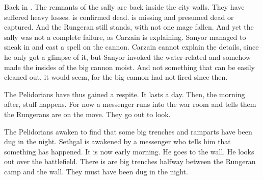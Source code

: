 
\begin{comment}
  \section{Takestsha casts the witch-storm}
\end{comment}


\begin{comment}
  \subsection{Pelidorian war room}
\end{comment}

Back in \Forclin. 
The remnants of the sally are back inside the city walls. 
They have suffered heavy losses. 
\Dornaer is confirmed dead. 
\Rah[\Theal] \Kintaer is missing and presumed dead or captured. 
And the Rungeran \ishrah still stands, with not one mage fallen.
And yet the sally was not a complete failure, as Carzain \Shachar is explaining. 
Sanyor managed to sneak in and cast a spell on the cannon. 
Carzain cannot explain the details, since he only got a glimpse of it, but Sanyor invoked the water-related \sephiroth and somehow made the insides of the big cannon moist. 
And not something that can be easily cleaned out, it would seem, for the big cannon had not fired since then. 

The Pelidorians have thus gained a respite.
It lasts a day. 
Then, the morning after, stuff happens. 
For now a messenger runs into the war room and tells them the Rungerans are on the move. 
They go out to look. 



\begin{comment}
  \subsection{\Takestsha moves}
\end{comment}
\new
The Pelidorians awaken to find that some big trenches and ramparts have been dug in the night. 
Sethgal is awakened by a messenger who tells him that something has happened. 
It is now early morning. 
He goes to the wall.
He looks out over the battlefield. 
There is are big trenches halfway between the Rungeran camp and the wall. 
They must have been dug in the night. 

